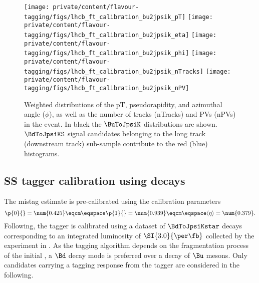 %
\begin{figure}
  \centering
  \texttt{[image: private/content/flavour-tagging/figs/lhcb\_ft\_calibration\_bu2jpsik\_pT]}
  \texttt{[image: private/content/flavour-tagging/figs/lhcb\_ft\_calibration\_bu2jpsik\_eta]}
  \texttt{[image: private/content/flavour-tagging/figs/lhcb\_ft\_calibration\_bu2jpsik\_phi]}
  \texttt{[image: private/content/flavour-tagging/figs/lhcb\_ft\_calibration\_bu2jpsik\_nTracks]}
  \texttt{[image: private/content/flavour-tagging/figs/lhcb\_ft\_calibration\_bu2jpsik\_nPV]}
  \caption{Weighted distributions of the \Bmeson \acf{pT}, \acf{pseudorapidity},
  and azimuthal angle ($\phi$), as well as the number of tracks (nTracks) and
  \aclp{PV} (n\acsp{PV}) in the event. In black the $\BuToJpsiK$ distributions
  are shown. $\BdToJpsiKS$ signal candidates belonging to the long track
  (downstream track) sub-sample contribute to the red (blue) histograms.
  \cite{FT:RunI} 
  }
  \label{fig:flavour_tagging:calibration:os:parameter_distributions}
\end{figure}
%

\subsection[
  head={\ac{SS} tagger calibration using \BdToJpsiKstar decays},
  tocentry={\ac{SS} tagger calibration using \BdToJpsiKstarHyperref decays}
]{\ac{SS} tagger calibration using \BdToJpsiKstarbfsf decays}
\label{sec:flavour_tagging:calibration:ss}

The \SSpi mistag estimate is pre-calibrated using the calibration parameters
%
\begin{equation}
\label{eq:tagging:sspion_precalibration}
    \p{0}{} = \num{0.425}\eqcm\eqspace
    \p{1}{} = \num{0.939}\eqcm\eqspace
    \langle\eta\rangle = \num{0.379}.
\end{equation}
%
Following, the \SSpi tagger is calibrated using a dataset of $\BdToJpsiKstar$
decays corresponding to an integrated luminosity of $\SI{3.0}{\per\fb}$
collected by the \LHCb experiment in \RunOne. As the \SSpi tagging algorithm
depends on the fragmentation process of the initial \Bmeson, a $\Bd$ decay mode
is preferred over a decay of $\Bu$ mesons. Only candidates carrying a tagging
response from the \SSpi tagger are considered in the following.

